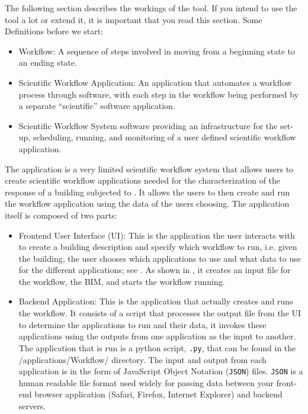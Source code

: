 The following section describes the workings of the tool. If you
intend to use the tool a lot or extend it, it is important that you
read this section.  Some Definitions before we start:
\begin{itemize}
\item Workflow: A sequence of steps involved in moving from a
  beginning state to an ending state.
\item Scientific Workflow Application: An application that automates a
  workflow process through software, with each step in the workflow
  being performed by a separate “scientific” software application.
\item Scientific Workflow System software providing an infrastructure
  for the set-up, scheduling, running, and monitoring of a user
  defined scientific workflow application.
\end{itemize}

The \texttt{\getsoftwarename{}} application is a very limited
scientific workflow system that allows users to create scientific
workflow applications needed for the characterization of the response
of a building subjected to . It allows the users to then
create and run the workflow application using the data of the users
choosing. The application itself is composed of two parts:

\begin{itemize}
\item Frontend User Interface (UI): This is the application the user
  interacts with to create a building description and
  specify which workflow to run, i.e. given the building, the user
  chooses which applications to use and what data to use for the
  different applications; see . As shown in , it 
  creates an input file for the workflow, the BIM, and starts the workflow running.  
\item Backend Application: This is the application that actually
  creates and runs the workflow. It consists of a script that
  processes the output file from the UI to determine the applications
  to run and their data, it invokes these applications using the
  outputs from one application as the input to another. The
  application that is run is a python script, \texttt{\getsoftwarename{}.py}, that can be
  found in the /applications/Workflow/ directory.  The input and
  output from each application is in the form of JavaScript Object
  Notation (\texttt{JSON}) files. \texttt{JSON} is a human readable file format used
  widely for passing data between your front-end browser application
  (Safari, Firefox, Internet Explorer) and backend servers.
\end{itemize}


